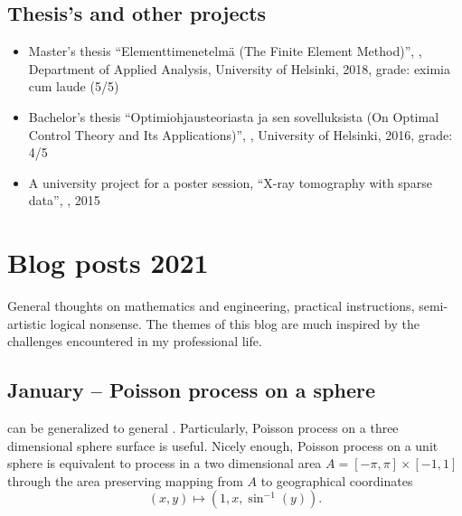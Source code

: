 \documentclass{article}
\begin{document}
        \subsection{Thesis's and other projects}
        \begin{itemize}
        \item Master's thesis ``Elementtimenetelmä (The Finite Element Method)'', , Department of Applied Analysis, University of Helsinki, 2018, grade: eximia cum laude (5/5)
        \item Bachelor's thesis ``Optimiohjausteoriasta ja sen sovelluksista (On Optimal Control Theory and Its Applications)'', , University of Helsinki, 2016, grade: 4/5          
        \item A university project for a poster session, ``X-ray tomography with sparse data'', , 2015
          
        \end{itemize}
        
        

        \section{Blog posts 2021}
        General thoughts on mathematics and engineering, practical instructions, semi-artistic logical nonsense. The themes of this blog are much inspired by the challenges encountered in my professional life. 

        \subsection{January – Poisson process on a sphere}
         can be generalized to general . Particularly, Poisson process on a three dimensional sphere surface is useful. Nicely enough, Poisson process on a unit sphere is equivalent to process in a two dimensional area $ A = [-\pi,\pi] \times [-1,1]$ through the area preserving mapping from $A$ to geographical coordinates
        \begin{equation}
          (x,y) \mapsto (1,x,\sin^{-1}(y)) \nonumber.
        \end{equation}
\end{document}
